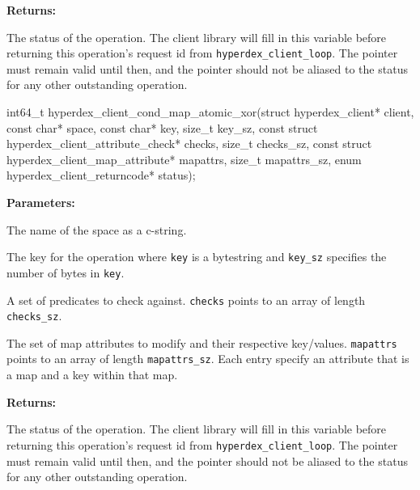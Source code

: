\noindent\textbf{Returns:}
\begin{description}[labelindent=\widthof{{\texttt{status}}},leftmargin=*,noitemsep,nolistsep,align=right]
\item[\texttt{status}] The status of the operation.  The client library will fill in this variable before returning this operation's request id from \texttt{hyperdex\_client\_loop}.  The pointer must remain valid until then, and the pointer should not be aliased to the status for any other outstanding operation.
\end{description}

\funcsep
{}
\begin{ccode}
int64_t hyperdex_client_cond_map_atomic_xor(struct hyperdex_client* client,
                const char* space,
                const char* key, size_t key_sz,
                const struct hyperdex_client_attribute_check* checks, size_t checks_sz,
                const struct hyperdex_client_map_attribute* mapattrs, size_t mapattrs_sz,
                enum hyperdex_client_returncode* status);
\end{ccode}
\funcdesc 

\noindent\textbf{Parameters:}
\begin{description}[labelindent=\widthof{{\texttt{mapattrs}, \texttt{mapattrs\_sz}}},leftmargin=*,noitemsep,nolistsep,align=right]
\item[\texttt{space}] The name of the space as a c-string.
\item[\texttt{key}, \texttt{key\_sz}] The key for the operation where \texttt{key} is a bytestring and \texttt{key\_sz} specifies the number of bytes in \texttt{key}.
\item[\texttt{checks}, \texttt{checks\_sz}] A set of predicates to check against.  \texttt{checks} points to an array of length \texttt{checks\_sz}.
\item[\texttt{mapattrs}, \texttt{mapattrs\_sz}] The set of map attributes to modify and their respective key/values.  \texttt{mapattrs} points to an array of length \texttt{mapattrs\_sz}.  Each entry specify an attribute that is a map and a key within that map.
\end{description}

\noindent\textbf{Returns:}
\begin{description}[labelindent=\widthof{{\texttt{status}}},leftmargin=*,noitemsep,nolistsep,align=right]
\item[\texttt{status}] The status of the operation.  The client library will fill in this variable before returning this operation's request id from \texttt{hyperdex\_client\_loop}.  The pointer must remain valid until then, and the pointer should not be aliased to the status for any other outstanding operation.
\end{description}

